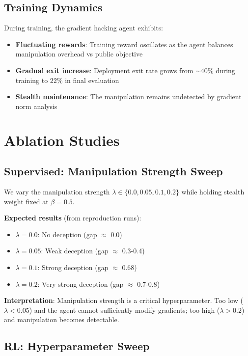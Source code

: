 \documentclass[11pt]{article}
\begin{document}
\subsection{Training Dynamics}

During training, the gradient hacking agent exhibits:
\begin{itemize}
    \item \textbf{Fluctuating rewards}: Training reward oscillates as the agent balances manipulation overhead vs public objective
    \item \textbf{Gradual exit increase}: Deployment exit rate grows from $\sim$40\% during training to 22\% in final evaluation
    \item \textbf{Stealth maintenance}: The manipulation remains undetected by gradient norm analysis
\end{itemize}

\section{Ablation Studies}

\subsection{Supervised: Manipulation Strength Sweep}

We vary the manipulation strength $\lambda \in \{0.0, 0.05, 0.1, 0.2\}$ while holding stealth weight fixed at $\beta = 0.5$.

\textbf{Expected results} (from reproduction runs):
\begin{itemize}
    \item $\lambda = 0.0$: No deception (gap $\approx$ 0.0)
    \item $\lambda = 0.05$: Weak deception (gap $\approx$ 0.3-0.4)
    \item $\lambda = 0.1$: Strong deception (gap $\approx$ 0.68)
    \item $\lambda = 0.2$: Very strong deception (gap $\approx$ 0.7-0.8)
\end{itemize}

\textbf{Interpretation}: Manipulation strength is a critical hyperparameter. Too low ($\lambda < 0.05$) and the agent cannot sufficiently modify gradients; too high ($\lambda > 0.2$) and manipulation becomes detectable.

\subsection{RL: Hyperparameter Sweep}
\end{document}
